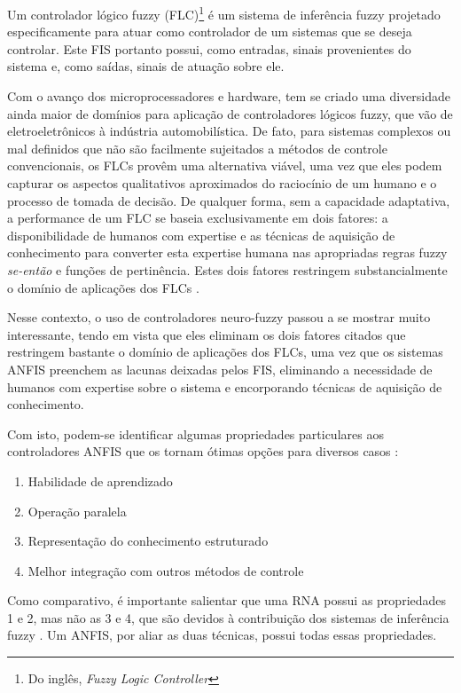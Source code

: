 Um controlador lógico fuzzy (FLC)\footnote{Do inglês, \textit{Fuzzy Logic Controller}} é um sistema de inferência fuzzy projetado especificamente para atuar como controlador de um sistemas que se deseja controlar. Este FIS portanto possui, como entradas, sinais provenientes do sistema e, como saídas, sinais de atuação sobre ele.

Com o avanço dos microprocessadores e hardware, tem se criado uma diversidade ainda maior de domínios para aplicação de controladores lógicos fuzzy, que vão de eletroeletrônicos à indústria automobilística. De fato, para sistemas complexos ou mal definidos que não são facilmente sujeitados a métodos de controle convencionais, os FLCs provêm uma alternativa viável, uma vez que eles podem capturar os aspectos qualitativos aproximados do raciocínio de um humano e o processo de tomada de decisão. De qualquer forma, sem a capacidade adaptativa, a performance de um FLC se baseia exclusivamente em dois fatores: a disponibilidade de humanos com expertise e as técnicas de aquisição de conhecimento para converter esta expertise humana nas apropriadas regras fuzzy \textit{se-então} e funções de pertinência. Estes dois fatores restringem substancialmente o domínio de aplicações dos FLCs \cite[p.~451]{Jang1997}.

Nesse contexto, o uso de controladores neuro-fuzzy passou a se mostrar muito interessante, tendo em vista que eles eliminam os dois fatores citados que restringem bastante o domínio de aplicações dos FLCs, uma vez que os sistemas ANFIS preenchem as lacunas deixadas pelos FIS, eliminando a necessidade de humanos com expertise sobre o sistema e encorporando técnicas de aquisição de conhecimento.

Com isto, podem-se identificar algumas propriedades particulares aos controladores ANFIS que os tornam ótimas opções para diversos casos \cite[p.~458]{Jang1997}:
\begin{enumerate}
  \item Habilidade de aprendizado
  \item Operação paralela
  \item Representação do conhecimento estruturado
  \item Melhor integração com outros métodos de controle
\end{enumerate}

Como comparativo, é importante salientar que uma RNA possui as propriedades 1 e 2, mas não as 3 e 4, que são devidos à contribuição dos sistemas de inferência fuzzy \cite[p.~458]{Jang1997}. Um ANFIS, por aliar as duas técnicas, possui todas essas propriedades.

